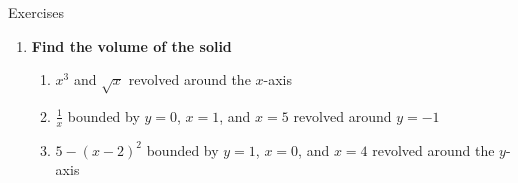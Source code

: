 \documentclass[../revisedmain.tex]{subfiles}
\begin{document}
\begin{center}
	\LARGE Exercises
\end{center}
\begin{enumerate}
	\item \textbf{Find the volume of the solid}
	\begin{enumerate}
		\item $x^3$ and $\sqrt{x}$ revolved around the $x$-axis
		\item $\frac{1}{x}$ bounded by $y=0$, $x=1$, and $x=5$ revolved around $y=-1$
		\item $5-(x-2)^2$ bounded by $y=1$, $x=0$, and $x=4$ revolved around the $y$-axis
	\end{enumerate}
\end{enumerate}
\end{document}
